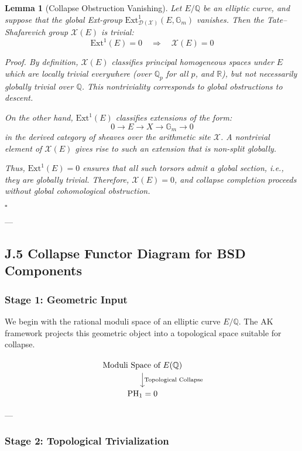 \documentclass[11pt]{article}
\newtheorem{lemma}[theorem]{Lemma}
\newcommand{\Sha}{\mathcal{X}}
\begin{document}
\begin{lemma}[Collapse Obstruction Vanishing]
Let $E/\mathbb{Q}$ be an elliptic curve, and suppose that the global Ext-group $\mathrm{Ext}^1_{\mathcal{D}(\mathcal{X})}(E, \mathbb{G}_m)$ vanishes. Then the Tate–Shafarevich group $\Sha(E)$ is trivial:
\[
\mathrm{Ext}^1(E) = 0 \quad \Rightarrow \quad \Sha(E) = 0
\]

\textit{Proof.}  
By definition, $\Sha(E)$ classifies principal homogeneous spaces under $E$ which are locally trivial everywhere (over $\mathbb{Q}_p$ for all $p$, and $\mathbb{R}$), but not necessarily globally trivial over $\mathbb{Q}$. This nontriviality corresponds to global obstructions to descent.

On the other hand, $\mathrm{Ext}^1(E)$ classifies extensions of the form:
\[
0 \to E \to X \to \mathbb{G}_m \to 0
\]
in the derived category of sheaves over the arithmetic site $\mathcal{X}$. A nontrivial element of $\Sha(E)$ gives rise to such an extension that is non-split globally.

Thus, $\mathrm{Ext}^1(E) = 0$ ensures that all such torsors admit a global section, i.e., they are globally trivial. Therefore, $\Sha(E) = 0$, and collapse completion proceeds without global cohomological obstruction.

\hfill$\square$
\end{lemma}


---

\subsection*{J.5 Collapse Functor Diagram for BSD Components}

\subsubsection*{Stage 1: Geometric Input}

We begin with the rational moduli space of an elliptic curve $E/\mathbb{Q}$.  
The AK framework projects this geometric object into a topological space suitable for collapse.

\[
\begin{tikzcd}
\text{Moduli Space of } E(\mathbb{Q}) \arrow[d, "\text{Topological Collapse}"]
\\
\mathrm{PH}_1 = 0
\end{tikzcd}
\]

---

\subsubsection*{Stage 2: Topological Trivialization}
\end{document}
